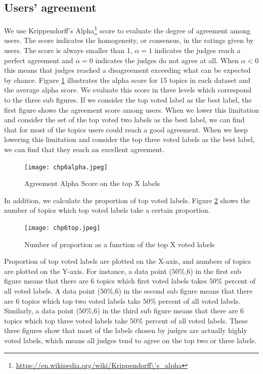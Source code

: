 \subsection{Users' agreement}
We use Krippendorff's Alpha\footnote{\url{https://en.wikipedia.org/wiki/Krippendorff\'s_alpha}} score to evaluate the degree of agreement among users. The score indicates the homogeneity, or consensus, in the ratings given by users. The score is always smaller than 1, $\alpha = 1 $ indicates the judges reach a perfect agreement and $\alpha =0 $ indicates the judges do not agree at all. When $\alpha <0 $ this means that judges reached a disagreement exceeding what can be expected by chance.  
Figure \ref{fig:chp6alpha} illustrates the alpha score for 15 topics in each dataset and the average alpha score. We evaluate this score in three levels which correspond to the three sub figures. If we consider the top voted label as the best label, the first figure shows the agreement score among users. When we lower this limitation and consider the set of the top voted two labels as the best label, we can find that for most of the topics users could reach a good agreement. When we keep lowering this limitation and consider the top three voted labels as the best label, we can find that they reach an excellent agreement. 



\begin{figure}[htp]
\caption{Agreement Alpha Score on the top X labels}
\label{fig:chp6alpha} 
\centering
\texttt{[image: chp6alpha.jpeg]}  
\end{figure}


In addition, we calculate the proportion of top voted labels. Figure \ref{fig:chp6top} shows the number of topics which top voted labels take a certain proportion.
\begin{figure}[htp]
\centering
\texttt{[image: chp6top.jpeg]}  
\caption{Number of proportion as a function of the top X voted labels}
\label{fig:chp6top} 
\end{figure}
Proportion of top voted labels are plotted on the X-axis, and numbers of topics are plotted on the Y-axis. For instance, a data point ($50\%$,6) in the first sub figure means that there are 6 topics which first voted labels takes $50\%$ percent of all voted labels. A data point ($50\%$,6) in the second sub figure means that there are 6 topics which top two voted labels take $50\%$ percent of all voted labels. Similarly, a data point ($50\%$,6) in the third sub figure means that there are 6 topics which top three voted labels take $50\%$ percent of all voted labels. These three figures show that most of the labels chosen by judges are actually highly voted labels, which means all judges tend to agree on the top two or three labels.




